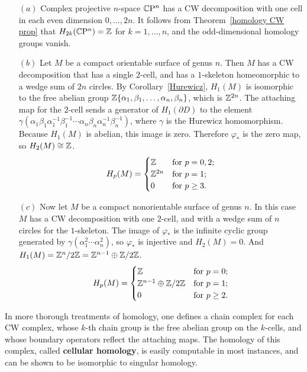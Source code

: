 \begin{example}
\mbox{}
\begin{itemize}
\item[$(a)$]Complex projective $n$-space $\mathbb{C}\mathrm{P}^n$ has a CW decomposition with one cell in each even dimension $0,\dots,2n$. It follows from Theorem~\ref{homology CW prop} that $H_{2k}(\mathbb{C}\mathrm{P}^n)=\mathbb{Z}$ for $k=1,\dots,n$, and the odd-dimensional homology groups vanish.
\item[$(b)$]Let $M$ be a compact orientable surface of genus $n$. Then $M$ has a CW decomposition that has a single $2$-cell, and has a $1$-skeleton homeomorphic to a 
wedge sum of $2n$ circles. By Corollary~\ref{Hurewicz}, $H_1(M)$ is isomorphic to the free abelian group $\mathbb{Z}\{\alpha_1,\beta_1,\dots,\alpha_n,\beta_n\}$, which is 
$\mathbb{Z}^{2n}$. The attaching map for the $2$-cell sends a generator of $H_1(\partial D)$ to the element $\gamma(\alpha_1\beta_1\alpha_1^{-1}\beta_1^{-1}\cdots\alpha_n\beta_n\alpha_n^{-1}\beta_n^{-1})$, where $\gamma$ is the Hurewicz homomorphism. Because $H_1(M)$ is abelian, this image is zero. Therefore $\varphi_*$ is the zero map, so $H_2(M)\cong\mathbb{Z}$.
\[H_p(M)=\begin{cases}
\mathbb{Z}&\text{for }p=0,2;\\
\mathbb{Z}^{2n}&\text{for }p=1;\\
0&\text{for }p\geq 3.
\end{cases}\]
\item[$(c)$]Now let $M$ be a compact nonorientable surface of genus $n$. In this case $M$ has a CW decomposition with one $2$-cell, and with a wedge sum of $n$ circles for the $1$-skeleton. The image of $\varphi_*$ is the infinite cyclic group generated by $\gamma(\alpha_1^2\cdots\alpha_n^2)$, so $\varphi_*$ is injective and $H_2(M)=0$. And $H_1(M)=\mathbb{Z}^n/2\mathbb{Z}=\mathbb{Z}^{n-1}\oplus\mathbb{Z}/2\mathbb{Z}$.
\[H_p(M)=\begin{cases}
\mathbb{Z}&\text{for }p=0;\\
\mathbb{Z}^{n-1}\oplus\mathbb{Z}/2\mathbb{Z}&\text{for }p=1;\\
0&\text{for }p\geq 2.
\end{cases}\]
\end{itemize}
\end{example}
In more thorough treatments of homology, one defines a chain complex for each CW complex, whose $k$-th chain group is the free abelian group on the $k$-cells, and whose boundary operators reflect the attaching maps. The homology of this complex, called \textbf{cellular homology}, is easily computable in most instances, and can be shown to be isomorphic to singular homology.
